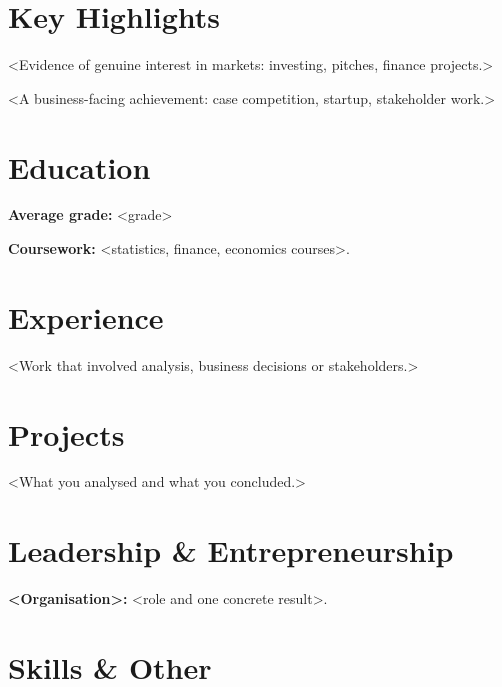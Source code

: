\documentclass{cv}
\begin{document}
\makecvheader

\section{Key Highlights}
\begin{bullets}
  \item <Evidence of genuine interest in markets: investing, pitches, finance projects.> %
  \item <A business-facing achievement: case competition, startup, stakeholder work.> %
\end{bullets}

\section{Education}
\begin{bullets}
  \item \textbf{Average grade:} <grade> %
  \item \textbf{Coursework:} <statistics, finance, economics courses>. %
\end{bullets}

\section{Experience}
\begin{bullets}
  \item <Work that involved analysis, business decisions or stakeholders.> %
\end{bullets}

\section{Projects}
\begin{bullets}
  \item <What you analysed and what you concluded.> %
\end{bullets}

\section{Leadership \& Entrepreneurship}
\begin{bullets}
  \item \textbf{<Organisation>:} <role and one concrete result>. %
\end{bullets}

\section{Skills \& Other}
\begin{skilltable}
\end{skilltable}
\end{document}
